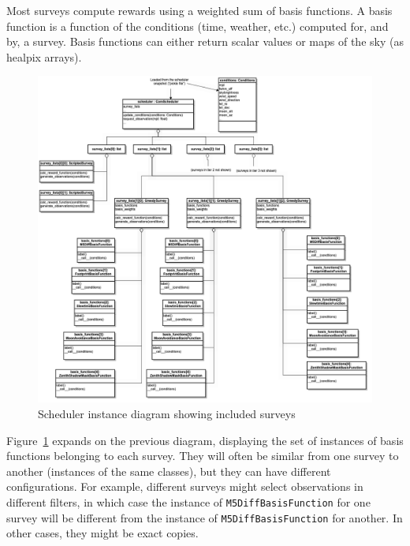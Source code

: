 \documentclass[OPS,lsstdraft,authoryear,toc]{lsstdoc}
\begin{document}
Most surveys compute rewards using a weighted sum of basis functions. A basis function is a function of the conditions (time, weather, etc.) computed for, and by, a survey. Basis functions can either return scalar values or maps of the sky (as healpix arrays).

\begin{figure}
    \centering
    \includegraphics[width=1.0\linewidth]{schedinst.png}
    \caption{Scheduler instance diagram showing included surveys}
    \label{fig:schedinst}
\end{figure}

Figure~\ref{fig:schedinst} expands on the previous diagram, displaying the set of instances of basis functions belonging to each survey. They will often be similar from one survey to another (instances of the same classes), but they can have different configurations. For example, different surveys might select observations in different filters, in which case the instance of \texttt{M5DiffBasisFunction} for one survey will be different from the instance of \texttt{M5DiffBasisFunction} for another. In other cases, they might be exact copies.
\end{document}
